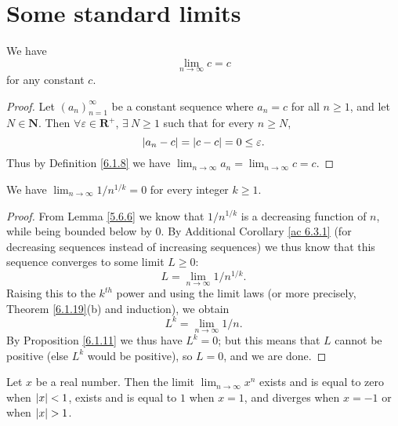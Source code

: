 \section{Some standard limits}\label{sec 6.5}

\begin{additional corollary}\label{ac 6.5.1}
We have
\[
    \lim_{n \to \infty} c = c
\]
for any constant \(c\).
\end{additional corollary}

\begin{proof}
    Let \((a_n)_{n = 1}^\infty\) be a constant sequence where \(a_n = c\) for all \(n \geq 1\), and let \(N \in \mathbf{N}\).
    Then \(\forall \varepsilon \in \mathbf{R}^+\), \(\exists\ N \geq 1\) such that for every \(n \geq N\),
    \[
        \abs*{a_n - c} = \abs*{c - c} = 0 \leq \varepsilon.
    \]
    Thus by Definition \ref{6.1.8} we have \(\lim_{n \to \infty} a_n = \lim_{n \to \infty} c = c\).
\end{proof}

\begin{corollary}\label{6.5.1}
    We have \(\lim_{n \to \infty} 1 / n^{1 / k} = 0\) for every integer \(k \geq 1\).
\end{corollary}

\begin{proof}
    From Lemma \ref{5.6.6} we know that \(1 / n^{1 / k}\) is a decreasing function of \(n\), while being bounded below by \(0\).
    By Additional Corollary \ref{ac 6.3.1} (for decreasing sequences instead of increasing sequences) we thus know that this sequence converges to some limit \(L \geq 0\):
    \[
        L = \lim_{n \to \infty} 1 / n^{1 / k}.
    \]
    Raising this to the \(k^{th}\) power and using the limit laws (or more precisely, Theorem \ref{6.1.19}(b) and induction), we obtain
    \[
        L^k = \lim_{n \to \infty} 1 / n.
    \]
    By Proposition \ref{6.1.11} we thus have \(L^k = 0\);
    but this means that \(L\) cannot be positive (else \(L^k\) would be positive), so \(L = 0\), and we are done.
\end{proof}

\begin{lemma}\label{6.5.2}
    Let \(x\) be a real number.
    Then the limit \(\lim_{n \to \infty} x^n\) exists and is equal to zero when \(\abs*{x} < 1\), exists and is equal to \(1\) when \(x = 1\), and diverges when \(x = -1\) or when \(\abs*{x} > 1\).
\end{lemma}


